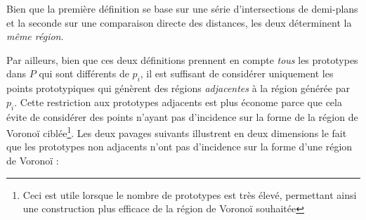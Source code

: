 \documentclass{article}
\begin{document}
Bien que la première définition se base sur une série d’intersections de demi-plans et
la seconde sur une comparaison directe des distances, les deux déterminent la \textit{même région}.

Par ailleurs, bien que ces deux définitions prennent en compte \textit{tous} les prototypes dans $P$ qui sont différents de $p_i$, il est suffisant de considérer uniquement les points prototypiques qui génèrent des régions \textit{adjacentes} à la région générée par $p_i$. Cette restriction aux prototypes adjacents est plus économe parce que cela évite de considérer des points n’ayant pas d’incidence sur la forme de la région de Voronoï ciblée\footnote{Ceci est utile lorsque le nombre de prototypes est très élevé, permettant ainsi une construction plus efficace de la région de Voronoï souhaitée}. Les deux pavages suivants illustrent en deux dimensions le fait que les prototypes non adjacents n’ont pas d’incidence sur la forme d’une région de Voronoï :
\end{document}

